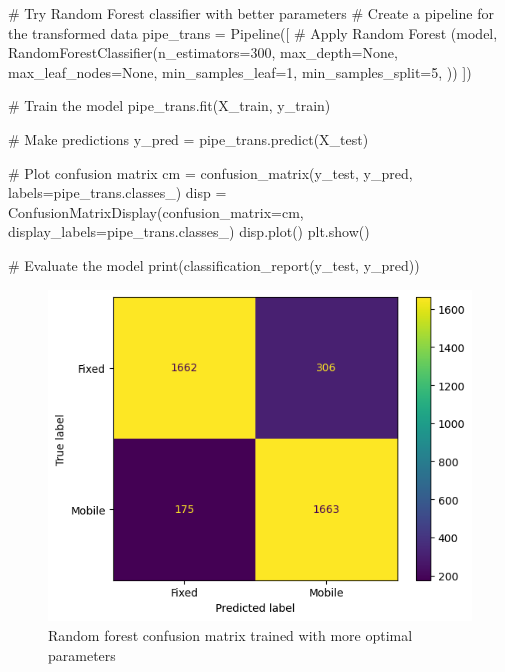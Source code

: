 \documentclass[
  letterpaper,
  DIV=11,
  numbers=noendperiod,
  oneside]{scrartcl}
\newenvironment{Shaded}{\begin{snugshade}}{\end{snugshade}}
\newcommand{\BuiltInTok}[1]{\textcolor[rgb]{0.00,0.23,0.31}{#1}}
\newcommand{\CommentTok}[1]{\textcolor[rgb]{0.37,0.37,0.37}{#1}}
\newcommand{\DecValTok}[1]{\textcolor[rgb]{0.68,0.00,0.00}{#1}}
\newcommand{\NormalTok}[1]{\textcolor[rgb]{0.00,0.23,0.31}{#1}}
\newcommand{\OperatorTok}[1]{\textcolor[rgb]{0.37,0.37,0.37}{#1}}
\newcommand{\StringTok}[1]{\textcolor[rgb]{0.13,0.47,0.30}{#1}}
\newcommand{\VariableTok}[1]{\textcolor[rgb]{0.07,0.07,0.07}{#1}}
\begin{document}
\begin{Shaded}
\begin{Highlighting}[]
\CommentTok{\# Try Random Forest classifier with better parameters}
\CommentTok{\# Create a pipeline for the transformed data}
\NormalTok{pipe\_trans }\OperatorTok{=}\NormalTok{ Pipeline([}
    \CommentTok{\# Apply Random Forest}
\NormalTok{    (}\StringTok{\textquotesingle{}model\textquotesingle{}}\NormalTok{, RandomForestClassifier(n\_estimators}\OperatorTok{=}\DecValTok{300}\NormalTok{, max\_depth}\OperatorTok{=}\VariableTok{None}\NormalTok{, max\_leaf\_nodes}\OperatorTok{=}\VariableTok{None}\NormalTok{, min\_samples\_leaf}\OperatorTok{=}\DecValTok{1}\NormalTok{, min\_samples\_split}\OperatorTok{=}\DecValTok{5}\NormalTok{,  ))  }
\NormalTok{])}

\CommentTok{\# Train the model}
\NormalTok{pipe\_trans.fit(X\_train, y\_train)}

\CommentTok{\# Make predictions}
\NormalTok{y\_pred }\OperatorTok{=}\NormalTok{ pipe\_trans.predict(X\_test)}

\CommentTok{\# Plot confusion matrix}
\NormalTok{cm }\OperatorTok{=}\NormalTok{ confusion\_matrix(y\_test, y\_pred, labels}\OperatorTok{=}\NormalTok{pipe\_trans.classes\_)}
\NormalTok{disp }\OperatorTok{=}\NormalTok{ ConfusionMatrixDisplay(confusion\_matrix}\OperatorTok{=}\NormalTok{cm, display\_labels}\OperatorTok{=}\NormalTok{pipe\_trans.classes\_)}
\NormalTok{disp.plot()}
\NormalTok{plt.show()}

\CommentTok{\# Evaluate the model}
\BuiltInTok{print}\NormalTok{(classification\_report(y\_test, y\_pred))}
\end{Highlighting}
\end{Shaded}

\begin{figure}[H]

{\centering \includegraphics{data-analytics_files/figure-latex/fig-randforest-betterpars-output-1.png}

}

\caption{\label{fig-randforest-betterpars}Random forest confusion matrix
trained with more optimal parameters}

\end{figure}
\end{document}
